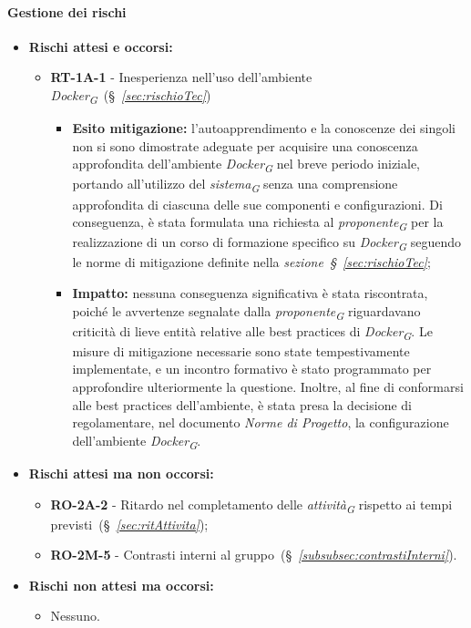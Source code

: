 \paragraph{Gestione dei rischi} 

\begin{itemize}
    \item \textbf{Rischi attesi e occorsi:}
\begin{itemize}
    \item \textbf{RT-1A-1} - Inesperienza nell'uso dell'ambiente \textit{Docker}\textsubscript{\textit{G}}~(\S~\textit{\ref{sec:rischioTec}})
    \begin{itemize}
        \item \textbf{Esito mitigazione:} 
            l'autoapprendimento e la conoscenze dei singoli non si sono dimostrate adeguate per acquisire una conoscenza approfondita dell'ambiente \textit{Docker}\textsubscript{\textit{G}} nel breve periodo iniziale, portando all'utilizzo del \textit{sistema}\textsubscript{\textit{G}} senza una comprensione approfondita di ciascuna delle sue componenti e configurazioni. Di conseguenza, è stata formulata una richiesta al \textit{proponente}\textsubscript{\textit{G}} per la realizzazione di un corso di formazione specifico su \textit{Docker}\textsubscript{\textit{G}} seguendo le norme di mitigazione definite nella \textit{sezione~\S~\ref{sec:rischioTec}};

        \pagebreak
        
        \item \textbf{Impatto:}
            nessuna conseguenza significativa è stata riscontrata, poiché le avvertenze segnalate dalla \textit{proponente}\textsubscript{\textit{G}} riguardavano criticità di lieve entità relative alle best practices di \textit{Docker}\textsubscript{\textit{G}}. Le misure di mitigazione necessarie sono state tempestivamente implementate, e un incontro formativo è stato programmato per approfondire ulteriormente la questione.
            Inoltre, al fine di conformarsi alle best practices dell'ambiente, è stata presa la decisione di regolamentare, nel documento \textit{Norme di Progetto}, la configurazione dell'ambiente \textit{Docker}\textsubscript{\textit{G}}.
    \end{itemize}
\end{itemize}
\item \textbf{Rischi attesi ma non occorsi:}
 \begin{itemize}
    \item \textbf{RO-2A-2} - Ritardo nel completamento delle \textit{attività}\textsubscript{\textit{G}} rispetto ai tempi previsti~(\S~\textit{\ref{sec:ritAttivita}});
    \item \textbf{RO-2M-5} - Contrasti interni al gruppo~(\S~\textit{\ref{subsubsec:contrastiInterni}}).
\end{itemize}
\item \textbf{Rischi non attesi ma occorsi:}
\begin{itemize}
    \item Nessuno.
\end{itemize}
\end{itemize}

